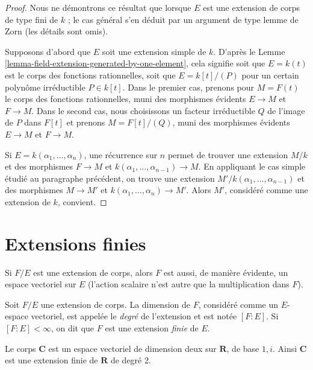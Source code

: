\begin{proof}
Nous ne démontrons ce résultat que lorsque $E$ est une extension de corps de type fini
de $k$ ; le cas général s'en déduit par un argument de type lemme de Zorn
(les détails sont omis).

\medskip\noindent
Supposons d'abord que $E$ soit une extension simple de $k$. D'après le
Lemme \ref{lemma-field-extension-generated-by-one-element},
cela signifie soit que $E = k(t)$ est le corps des fonctions rationnelles,
soit que $E = k[t]/(P)$ pour un certain polynôme irréductible $P \in k[t]$.
Dans le premier cas, prenons pour $M = F(t)$ le corps des fonctions rationnelles,
muni des morphismes évidents $E \to M$ et $F \to M$. Dans le second cas, nous
choisissons un facteur irréductible $Q$ de l'image de $P$ dans $F[t]$
et prenons $M = F[t]/(Q)$, muni des morphismes évidents $E \to M$ et $F \to M$.

\medskip\noindent
Si $E = k(\alpha_1, \ldots, \alpha_n)$, une récurrence sur $n$
permet de trouver une extension $M/k$ et des morphismes $F \to M$ et
$k(\alpha_1, \ldots, \alpha_{n - 1}) \to M$. En appliquant le cas simple
étudié au paragraphe précédent,
on trouve une extension $M'/k(\alpha_1, \ldots, \alpha_{n - 1})$
et des morphismes $M \to M'$ et $k(\alpha_1, \ldots, \alpha_n) \to M'$.
Alors $M'$, considéré comme une extension de $k$, convient.
\end{proof}




\section{Extensions finies}
\label{section-finite-extensions}

\noindent
Si $F/E$ est une extension de corps, alors $F$ est aussi, de manière évidente, un espace vectoriel
sur $E$ (l'action scalaire n'est autre que la multiplication dans $F$).

\begin{definition}
\label{definition-degree}
Soit $F/E$ une extension de corps. La dimension de $F$, considéré comme un
$E$-espace vectoriel, est appelée le {\it degré} de l'extension et est
notée $[F : E]$. Si $[F : E] < \infty$, on dit que $F$ est une extension
{\it finie} de $E$.
\end{definition}

\begin{example}
\label{example-C-over-R}
Le corps $\mathbf{C}$ est un espace vectoriel de dimension deux sur $\mathbf{R}$,
de base $1, i$. Ainsi $\mathbf{C}$ est une extension finie de $\mathbf{R}$
de degré 2.
\end{example}


